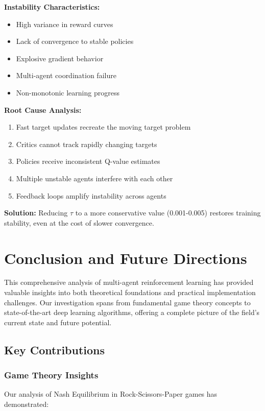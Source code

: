 \documentclass[conference]{IEEEtran}
\begin{document}
{{\textbf{Instability Characteristics:}
\begin{itemize}
    \item High variance in reward curves
    \item Lack of convergence to stable policies
    \item Explosive gradient behavior
    \item Multi-agent coordination failure
    \item Non-monotonic learning progress
\end{itemize}

\textbf{Root Cause Analysis:}
\begin{enumerate}
    \item Fast target updates recreate the moving target problem
    \item Critics cannot track rapidly changing targets
    \item Policies receive inconsistent Q-value estimates
    \item Multiple unstable agents interfere with each other
    \item Feedback loops amplify instability across agents
\end{enumerate}

\textbf{Solution:}
Reducing $\tau$ to a more conservative value (0.001-0.005) restores training stability, even at the cost of slower convergence.

\section{Conclusion and Future Directions}

This comprehensive analysis of multi-agent reinforcement learning has provided valuable insights into both theoretical foundations and practical implementation challenges. Our investigation spans from fundamental game theory concepts to state-of-the-art deep learning algorithms, offering a complete picture of the field's current state and future potential.

\subsection{Key Contributions}

\subsubsection{Game Theory Insights}

Our analysis of Nash Equilibrium in Rock-Scissors-Paper games has demonstrated:

}}
\end{document}
